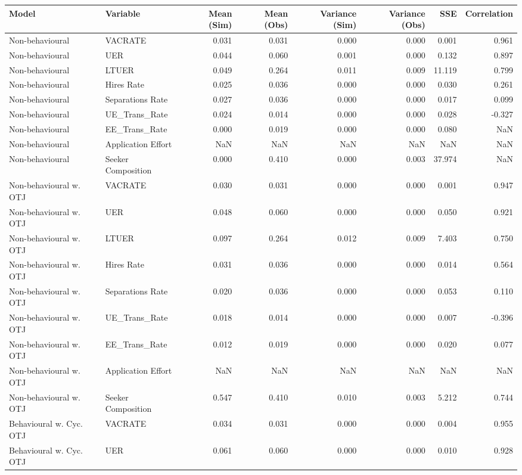 \begin{tabular}{llrrrrrr}
\toprule
Model & Variable & Mean (Sim) & Mean (Obs) & Variance (Sim) & Variance (Obs) & SSE & Correlation \\
\midrule
Non-behavioural & VACRATE & 0.031 & 0.031 & 0.000 & 0.000 & 0.001 & 0.961 \\
Non-behavioural & UER & 0.044 & 0.060 & 0.001 & 0.000 & 0.132 & 0.897 \\
Non-behavioural & LTUER & 0.049 & 0.264 & 0.011 & 0.009 & 11.119 & 0.799 \\
Non-behavioural & Hires Rate & 0.025 & 0.036 & 0.000 & 0.000 & 0.030 & 0.261 \\
Non-behavioural & Separations Rate & 0.027 & 0.036 & 0.000 & 0.000 & 0.017 & 0.099 \\
Non-behavioural & UE\_Trans\_Rate & 0.024 & 0.014 & 0.000 & 0.000 & 0.028 & -0.327 \\
Non-behavioural & EE\_Trans\_Rate & 0.000 & 0.019 & 0.000 & 0.000 & 0.080 & NaN \\
Non-behavioural & Application Effort & NaN & NaN & NaN & NaN & NaN & NaN \\
Non-behavioural & Seeker Composition & 0.000 & 0.410 & 0.000 & 0.003 & 37.974 & NaN \\
Non-behavioural w. OTJ & VACRATE & 0.030 & 0.031 & 0.000 & 0.000 & 0.001 & 0.947 \\
Non-behavioural w. OTJ & UER & 0.048 & 0.060 & 0.000 & 0.000 & 0.050 & 0.921 \\
Non-behavioural w. OTJ & LTUER & 0.097 & 0.264 & 0.012 & 0.009 & 7.403 & 0.750 \\
Non-behavioural w. OTJ & Hires Rate & 0.031 & 0.036 & 0.000 & 0.000 & 0.014 & 0.564 \\
Non-behavioural w. OTJ & Separations Rate & 0.020 & 0.036 & 0.000 & 0.000 & 0.053 & 0.110 \\
Non-behavioural w. OTJ & UE\_Trans\_Rate & 0.018 & 0.014 & 0.000 & 0.000 & 0.007 & -0.396 \\
Non-behavioural w. OTJ & EE\_Trans\_Rate & 0.012 & 0.019 & 0.000 & 0.000 & 0.020 & 0.077 \\
Non-behavioural w. OTJ & Application Effort & NaN & NaN & NaN & NaN & NaN & NaN \\
Non-behavioural w. OTJ & Seeker Composition & 0.547 & 0.410 & 0.010 & 0.003 & 5.212 & 0.744 \\
Behavioural w. Cyc. OTJ & VACRATE & 0.034 & 0.031 & 0.000 & 0.000 & 0.004 & 0.955 \\
Behavioural w. Cyc. OTJ & UER & 0.061 & 0.060 & 0.000 & 0.000 & 0.010 & 0.928 \\

\end{tabular}
